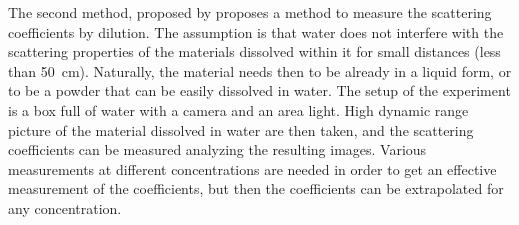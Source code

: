 The second method, proposed by \cite{Narasimhan:2006:ASP:1141911.1141986} proposes a method to measure the scattering coefficients by dilution. The assumption is that water does not interfere with the scattering properties of the materials dissolved within it for small distances (less than \SI{50}{cm}). Naturally, the material needs then to be already in  a liquid form, or to be a powder that can be easily dissolved in water. The setup of the experiment is a box full of water with a camera and an area light. High dynamic range picture of the material dissolved in water are then taken, and the scattering coefficients can be measured analyzing the resulting images. Various measurements at different concentrations are needed in order to get an effective measurement of the coefficients, but then the coefficients can be extrapolated for any concentration. 

